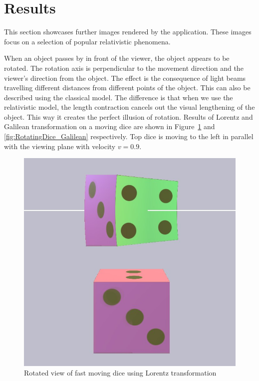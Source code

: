 \documentclass{egpubl}
\begin{document}
\section{Results}
\label{sec:results}
This section showcases further images rendered by the application. These images focus on a selection of popular relativistic phenomena.

When an object passes by in front of the viewer, the object appears to be rotated.  The rotation axis is perpendicular to the movement direction and the viewer's direction from the object. The effect is the consequence of light beams travelling different distances from different points of the object. This can also be described using the classical model. The difference is that when we use the relativistic model, the length contraction cancels out the visual lengthening of the object. This way it creates the perfect illusion of rotation. Results of Lorentz and Galilean transformation on a moving dice are shown in Figure~\ref{fig:RotatingDice} and \ref{fig:RotatingDice_Galilean} respectively. Top dice is moving to the left in parallel with the viewing plane with velocity $v=0.9$. 
\begin{figure}[htb]
\center
\includegraphics[width=0.8\linewidth]{figures/rotatingDice.jpg}
\caption{Rotated view of fast moving dice using Lorentz transformation}
\label{fig:RotatingDice}
\end{figure}
\end{document}
